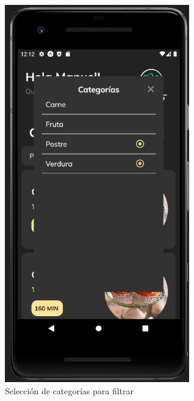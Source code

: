 \begin{figure}[!h]
  \centering
  \includegraphics[width=8cm, scale=1]{Images/Imagenes/recetas2.png}
  \caption{Selección de categorías para filtrar}
  \label{fig:recetas2}
\end{figure}

